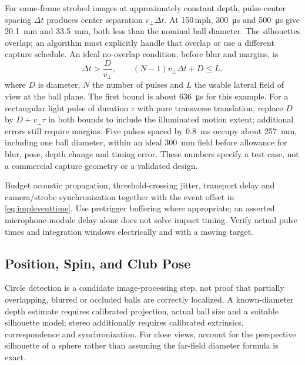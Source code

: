 For same-frame strobed images at approximately constant depth, pulse-center spacing $\Delta t$ produces center separation $v_\perp\Delta t$.
At 150\,mph, \SI{300}{\micro\second} and \SI{500}{\micro\second} give \SI{20.1}{\milli\meter} and \SI{33.5}{\milli\meter}, both less than the nominal ball diameter.
The silhouettes overlap; an algorithm must explicitly handle that overlap or use a different capture schedule.
An ideal no-overlap condition, before blur and margins, is
\begin{equation}
\Delta t>\frac{D}{v_\perp},\qquad
(N-1)v_\perp\Delta t+D\le L,
\label{eq:implstrobebudget}
\end{equation}
where $D$ is diameter, $N$ the number of pulses and $L$ the usable lateral field of view at the ball plane.
The first bound is about \SI{636}{\micro\second} for this example.
For a rectangular light pulse of duration $\tau$ with pure transverse translation, replace $D$ by $D+v_\perp\tau$ in both bounds to include the illuminated motion extent; additional errors still require margins.
Five pulses spaced by \SI{0.8}{\milli\second} occupy about \SI{257}{\milli\meter}, including one ball diameter, within an ideal \SI{300}{\milli\meter} field before allowance for blur, pose, depth change and timing error.
These numbers specify a test case, not a commercial capture geometry or a validated design.

Budget acoustic propagation, threshold-crossing jitter, transport delay and camera/strobe synchronization together with the event offset in \cref{eq:impleventtime}.
Use pretrigger buffering where appropriate; an asserted microphone-module delay alone does not solve impact timing.
Verify actual pulse times and integration windows electrically and with a moving target.

\subsection{Position, Spin, and Club Pose}

Circle detection is a candidate image-processing step, not proof that partially overlapping, blurred or occluded balls are correctly localized.
A known-diameter depth estimate requires calibrated projection, actual ball size and a suitable silhouette model; stereo additionally requires calibrated extrinsics, correspondence and synchronization.
For close views, account for the perspective silhouette of a sphere rather than assuming the far-field diameter formula is exact.


